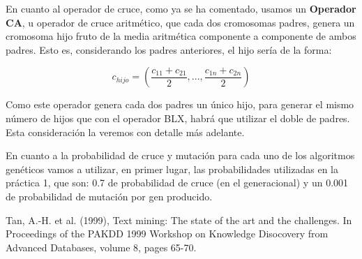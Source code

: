 \documentclass{article}
\begin{document}
En cuanto al operador de cruce, como ya se ha comentado, usamos un \textbf{Operador CA}, u operador de cruce aritmético, que cada dos cromosomas padres, genera un cromosoma hijo fruto de la media aritmética componente a componente de ambos padres. Esto es, considerando los padres anteriores, el hijo sería de la forma:

\[
c_{hijo} = ( \frac{c_{11} + c_{21}}{2}, ..., \frac{c_{1n} + c_{2n}}{2})
\]

Como este operador genera cada dos padres un único hijo, para generar el mismo número de hijos que con el operador BLX, habrá que utilizar el doble de padres. Esta consideración la veremos con detalle más adelante.

En cuanto a la probabilidad de cruce y mutación para cada uno de los algoritmos genéticos vamos a utilizar, en primer lugar, las probabilidades utilizadas en la práctica 1, que son: 0.7 de probabilidad de cruce (en el generacional) y un 0.001 de probabilidad de mutación por gen producido.
\begin{thebibliography}{99}
 \hspace{-.22cm} Tan, A.-H. et al. (1999), Text mining: The state of the art and
	the challenges. In Proceedings of the PAKDD 1999 Workshop on Knowledge
	Disocovery from Advanced Databases, volume 8, pages 65-70.
\end{thebibliography}
\end{document}
